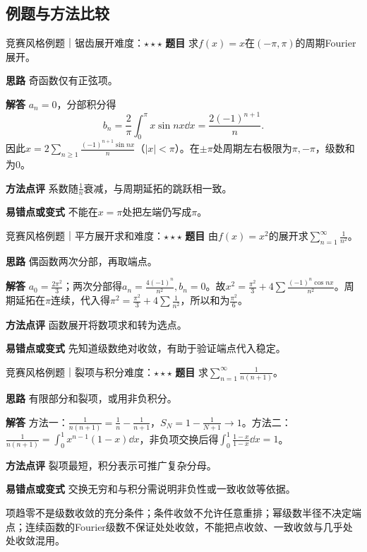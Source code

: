 \subsection{例题与方法比较}
\begin{example}{竞赛风格例题｜锯齿展开}{难度：$\star\star\star$}
\label{ex:9:13}\textbf{题目} 求$f(x)=x$在$(-\pi,\pi)$的周期Fourier展开。\par
\textbf{思路} 奇函数仅有正弦项。\par
\textbf{解答} $a_n=0$，分部积分得\[b_n=\dfrac2\pi\int_0^\pi x\sin nx\dd x=\dfrac{2(-1)^{n+1}}n.\]因此$x=2\sum_{n\ge1}\frac{(-1)^{n+1}\sin nx}{n}$（$|x|<\pi$）。在$\pm\pi$处周期左右极限为$\pi,-\pi$，级数和为0。\par
\textbf{方法点评} 系数随$\frac{1}{n}$衰减，与周期延拓的跳跃相一致。\par
\textbf{易错点或变式} 不能在$x=\pi$处把左端仍写成$\pi$。
\end{example}
\begin{example}{竞赛风格例题｜平方展开求和}{难度：$\star\star\star$}
\label{ex:9:14}\textbf{题目} 由$f(x)=x^2$的展开求$\sum_{n=1}^{\infty}\frac{1}{n^2}$。\par
\textbf{思路} 偶函数两次分部，再取端点。\par
\textbf{解答} $a_0=\frac{2\pi^2}{3}$；两次分部得$a_n=\frac{4(-1)^n}{n^2},b_n=0$。故$x^2=\frac{\pi^2}{3}+4\sum\frac{(-1)^n\cos nx}{n^2}$。周期延拓在$\pi$连续，代入得$\pi^2=\frac{\pi^2}{3}+4\sum\frac{1}{n^2}$，所以和为$\frac{\pi^2}{6}$。\par
\textbf{方法点评} 函数展开将数项求和转为选点。\par
\textbf{易错点或变式} 先知道级数绝对收敛，有助于验证端点代入稳定。
\end{example}
\begin{example}{竞赛风格例题｜裂项与积分}{难度：$\star\star\star$}
\label{ex:9:15}\textbf{题目} 求$\sum_{n=1}^{\infty}\frac{1}{n(n+1)}$。\par
\textbf{思路} 有限部分和裂项，或用非负积分。\par
\textbf{解答} 方法一：$\frac{1}{n(n+1)}=\frac{1}{n}-\frac{1}{n+1}$，$S_N=1-\frac{1}{N+1}\to1$。方法二：$\frac{1}{n(n+1)}=\int_0^1x^{n-1}(1-x)\dd x$，非负项交换后得$\int_0^1\frac{1-x}{1-x}\dd x=1$。\par
\textbf{方法点评} 裂项最短，积分表示可推广复杂分母。\par
\textbf{易错点或变式} 交换无穷和与积分需说明非负性或一致收敛等依据。
\end{example}
\begin{warning}项趋零不是级数收敛的充分条件；条件收敛不允许任意重排；幂级数半径不决定端点；连续函数的Fourier级数不保证处处收敛，不能把点收敛、一致收敛与几乎处处收敛混用。\end{warning}



